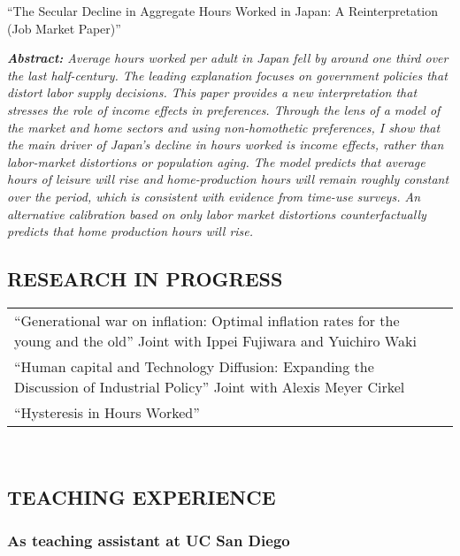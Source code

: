 \documentclass{article}
\begin{document}
``The Secular Decline in Aggregate Hours Worked in
Japan: A Reinterpretation (Job Market Paper)'' \\
\begin{center}
\begin{minipage}{0.9\linewidth}
    \textit{\textbf{Abstract:}
        Average hours worked per adult in Japan fell by around one third over the last half-century. The leading explanation focuses on government policies that distort labor supply decisions. This paper provides a new interpretation that stresses the role of income effects in preferences. Through the lens of a model of the market and home sectors and using non-homothetic preferences, I show that the main driver of Japan's decline in hours worked is income effects, rather than labor-market distortions or population aging. The model predicts that average hours of leisure will rise and home-production hours will remain roughly constant over the period, which is consistent with evidence from time-use surveys. An alternative calibration based on only labor market distortions counterfactually predicts that home production hours will rise.} \\
\end{minipage}
\end{center}

\subsection*{RESEARCH IN PROGRESS}

\begin{tabularx}{\textwidth}{XX}
``Generational war on inflation: Optimal inflation rates for the young and the old'' Joint with Ippei Fujiwara and Yuichiro Waki \\
``Human capital and Technology Diffusion:
Expanding the Discussion of Industrial Policy'' Joint with Alexis Meyer Cirkel\\
``Hysteresis in Hours Worked''\\
\end{tabularx}
\\

\subsection*{TEACHING EXPERIENCE}


\subsubsection*{As teaching assistant at UC San Diego}
\end{document}
